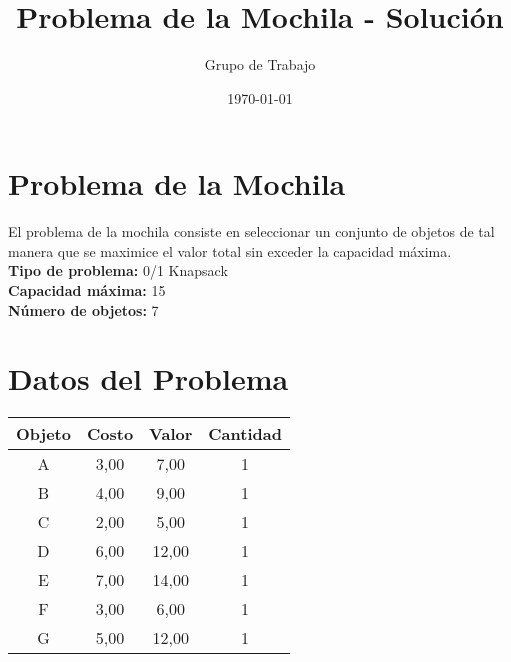 \documentclass{article}
\title{Problema de la Mochila - Solución}
\author{Grupo de Trabajo}
\date{\today}
\begin{document}
\maketitle

\section*{Problema de la Mochila}
El problema de la mochila consiste en seleccionar un conjunto de objetos de tal manera que se maximice el valor total sin exceder la capacidad máxima.\\

\textbf{Tipo de problema:} 0/1 Knapsack\\
\textbf{Capacidad máxima:} 15\\
\textbf{Número de objetos:} 7\\

\section*{Datos del Problema}
\begin{tabular}{|c|c|c|c|}
\hline
Objeto & Costo & Valor & Cantidad \\
\hline
A & 3,00 & 7,00 & 1 \\
B & 4,00 & 9,00 & 1 \\
C & 2,00 & 5,00 & 1 \\
D & 6,00 & 12,00 & 1 \\
E & 7,00 & 14,00 & 1 \\
F & 3,00 & 6,00 & 1 \\
G & 5,00 & 12,00 & 1 \\
\hline
\end{tabular}
\end{document}
